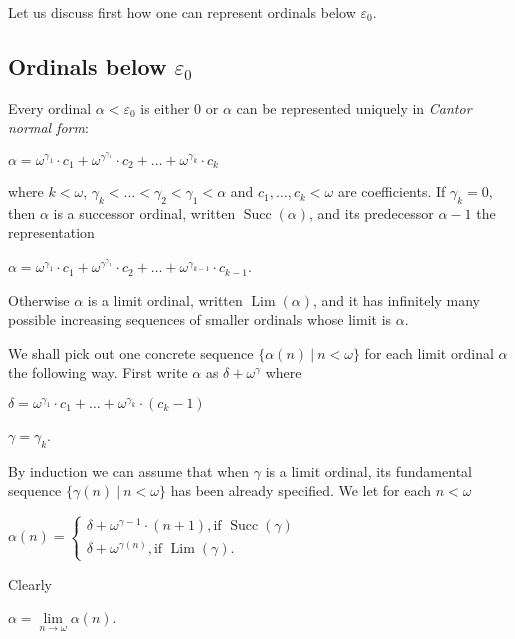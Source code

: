 \documentclass[8pt]{article}
\theoremstyle{definition}
\theoremstyle{definition}
\theoremstyle{definition}
\theoremstyle{definition}
\theoremstyle{definition}
\theoremstyle{definition}
\theoremstyle{definition}
\theoremstyle{definition}
\theoremstyle{definition}
\theoremstyle{definition}
\theoremstyle{definition}
\theoremstyle{definition}
\theoremstyle{definition}
\theoremstyle{question}
\begin{document}
Let us discuss first how one can represent ordinals below $\varepsilon_0$.

\subsection{Ordinals below $\varepsilon_0$}

Every ordinal $\alpha < \varepsilon_0$ is either $0$ or $\alpha$ can be represented uniquely in \emph{Cantor normal form}:
\begin{center}
  $\alpha = \omega^{\gamma_1} \cdot c_1 + \omega^{\gamma^{\gamma_1}} \cdot c_2 + \dots + \omega^{\gamma_k} \cdot c_k$
\end{center}
where $k < \omega$, $\gamma_k < \dots < \gamma_2 < \gamma_1 < \alpha$ and $c_1, \dots, c_k < \omega$ are coefficients.
If $\gamma_k = 0$, then $\alpha$ is a successor ordinal, written $\operatorname{Succ}(\alpha)$, 
and its predecessor $\alpha - 1$ the representation
\begin{center}
  $\alpha = \omega^{\gamma_1} \cdot c_1 + \omega^{\gamma^{\gamma_1}} \cdot c_2 + \dots + \omega^{\gamma_{k - 1}} \cdot c_{k - 1}$.
\end{center}

Otherwise $\alpha$ is a limit ordinal, written $\operatorname{Lim}(\alpha)$, and it has infinitely many possible
increasing sequences of smaller ordinals whose limit is $\alpha$.

We shall pick out one concrete sequence $\{ \alpha(n) \: | \: n < \omega \}$ for each limit ordinal $\alpha$ the following way.
First write $\alpha$ as $\delta + \omega^{\gamma}$ where
\begin{center}
  $\delta = \omega^{\gamma_1} \cdot c_1 + \dots + \omega^{\gamma_k} \cdot (c_k - 1)$

  $\gamma = \gamma_k$.
\end{center}

By induction we can assume that when $\gamma$ is a limit ordinal, its fundamental sequence 
$\{ \gamma(n) \: | \: n < \omega \}$ has been already specified. We let for each $n < \omega$
\begin{center}
  $\alpha(n) = \begin{cases}
    \delta + \omega^{\gamma - 1} \cdot (n + 1), \text{if $\operatorname{Succ}(\gamma)$} \\
    \delta + \omega^{\gamma(n)}, \text{if $\operatorname{Lim}(\gamma)$}.
  \end{cases}$
\end{center}
Clearly
\begin{center}
  $\alpha = \lim \limits_{n \to \omega} \alpha(n)$.
\end{center}
\end{document}
